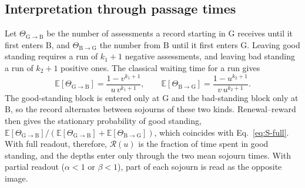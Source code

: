 \documentclass[fleqn,10pt]{article}
\theoremstyle{plain}
\theoremstyle{remark}
\newcommand{\Rm}{\mathcal R}
\newcommand{\G}{\mathrm G}
\newcommand{\B}{\mathrm B}
\begin{document}
\subsection{Interpretation through passage times}
Let $\Theta_{\G\to\B}$ be the number of assessments a record starting in $\G$
receives until it first enters $\B$, and $\Theta_{\B\to\G}$ the number from $\B$
until it first enters $\G$. Leaving good standing requires a run of $k_1+1$
negative assessments, and leaving bad standing a run of $k_2+1$ positive ones.
The classical waiting time for a run gives
\begin{equation}
\mathbb E[\Theta_{\G\to\B}]=\frac{1-v^{k_1+1}}{u\,v^{k_1+1}},\qquad
\mathbb E[\Theta_{\B\to\G}]=\frac{1-u^{k_2+1}}{v\,u^{k_2+1}} .
\label{eq:S-passage}
\end{equation}
The good-standing block is entered only at $\G$ and the bad-standing block only
at $\B$, so the record alternates between sojourns of these two kinds.
Renewal--reward then gives the stationary probability of good standing,
$\mathbb E[\Theta_{\G\to\B}]/(\mathbb E[\Theta_{\G\to\B}]+\mathbb E[\Theta_{\B\to\G}])$,
which coincides with Eq.~\eqref{eq:S-full}. With full readout, therefore,
$\Rm(u)$ is the fraction of time spent in good standing, and the depths enter
only through the two mean sojourn times. With partial readout ($\alpha<1$ or
$\beta<1$), part of each sojourn is read as the opposite image.
\end{document}
